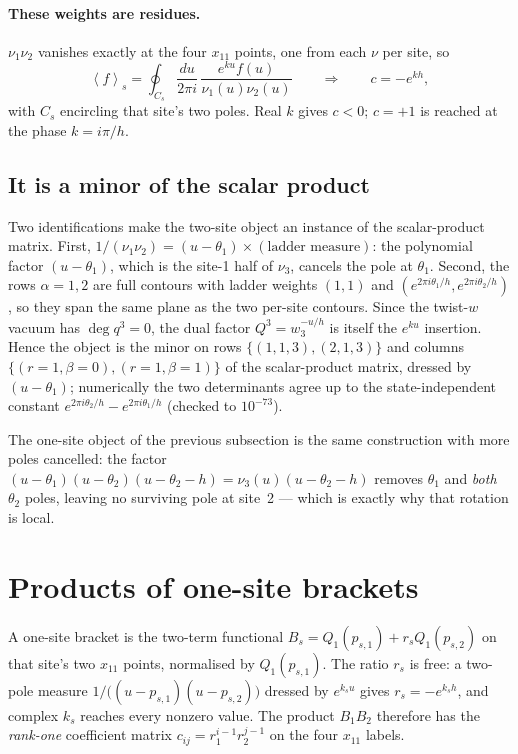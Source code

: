 \documentclass[11pt]{article}
\newcommand{\Ev}[1]{\left\langle #1 \right\rangle}
\begin{document}
\paragraph{These weights are residues.} $\nu_1\nu_2$ vanishes exactly at the four $x_{11}$ points,
one from each $\nu$ per site, so
\begin{equation}
\Ev{f}_s=\oint_{C_s}\frac{du}{2\pi i}\,\frac{e^{ku}f(u)}{\nu_1(u)\nu_2(u)}
\qquad\Longrightarrow\qquad c=-e^{kh},
\end{equation}
with $C_s$ encircling that site's two poles. Real $k$ gives $c<0$; $c=+1$ is reached at the phase
$k=i\pi/h$.

\subsection{It is a minor of the scalar product}

Two identifications make the two-site object an instance of the scalar-product matrix.
First, $1/(\nu_1\nu_2)=(u-\theta_1)\times(\text{ladder measure})$: the polynomial factor
$(u-\theta_1)$, which is the site-1 half of $\nu_3$, cancels the pole at $\theta_1$.
Second, the rows $\alpha=1,2$ are full contours with ladder weights $(1,1)$ and
$(e^{2\pi i\theta_1/h},e^{2\pi i\theta_2/h})$, so they span the same plane as the two per-site
contours. Since the twist-$w$ vacuum has $\deg q^3=0$, the dual factor $Q^3=w_3^{-u/h}$ is itself
the $e^{ku}$ insertion. Hence the object is the minor on rows $\{(1,1,3),(2,1,3)\}$ and columns
$\{(r{=}1,\beta{=}0),(r{=}1,\beta{=}1)\}$ of the scalar-product matrix, dressed by $(u-\theta_1)$;
numerically the two determinants agree up to the state-independent constant
$e^{2\pi i\theta_2/h}-e^{2\pi i\theta_1/h}$ (checked to $10^{-73}$).

The one-site object of the previous subsection is the same construction with more poles cancelled:
the factor $(u-\theta_1)(u-\theta_2)(u-\theta_2-h)=\nu_3(u)(u-\theta_2-h)$ removes $\theta_1$ and
\emph{both} $\theta_2$ poles, leaving no surviving pole at site~2 --- which is exactly why that
rotation is local.

\section{Products of one-site brackets}

A one-site bracket is the two-term functional $B_s=Q_1(p_{s,1})+r_sQ_1(p_{s,2})$ on that site's two
$x_{11}$ points, normalised by $Q_1(p_{s,1})$. The ratio $r_s$ is free: a two-pole measure
$1/\big((u-p_{s,1})(u-p_{s,2})\big)$ dressed by $e^{k_su}$ gives $r_s=-e^{k_sh}$, and complex $k_s$
reaches every nonzero value. The product $B_1B_2$ therefore has the \emph{rank-one} coefficient
matrix $c_{ij}=r_1^{i-1}r_2^{j-1}$ on the four $x_{11}$ labels.
\end{document}
